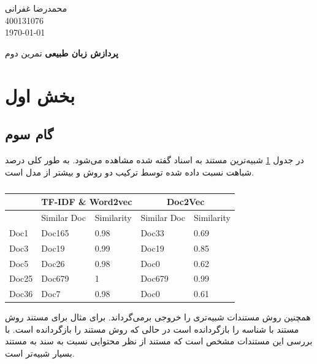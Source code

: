 \documentclass[12pt, a4paper]{article}
\newcommand{\coursetitle}{پردازش زبان طبیعی}
\newcommand{\doctitle}{تمرین دوم}
\newcommand{\name}{محمدرضا غفرانی}
\newcommand{\studentno}{400131076}
\newcommand{\todaydate}{\today}
\begin{document}
\begin{flushleft}
    \name \\
    \studentno \\
    \todaydate
\end{flushleft}

\begin{center}
    \huge
    \textbf{\coursetitle}
    \break
    \large
    \doctitle
\end{center}

\thispagestyle{plain}

\section*{بخش اول}

\subsection*{گام سوم}

در جدول \ref{similar_documents} شبیه‌ترین مستند به اسناد گفته شده مشاهده می‌شود.
به طور کلی درصد شباهت نسبت داده شده توسط ترکیب دو روش  و 
بیشتر از مدل  است.

\begin{latin}
    \begin{table}[h]
        \caption{}
        \label{similar_documents}
        \begin{tabular}[]{l|l|l||l|l}
            & \multicolumn{2}{c||}{TF-IDF \& Word2vec} & \multicolumn{2}{c}{Doc2Vec} \\ \hline
             & Similar Doc & Similarity & Similar Doc & Similarity \\ \hline
            Doc1  & Doc165 & 0.98 & Doc33  & 0.69 \\
            Doc3  & Doc19  & 0.99 & Doc19  & 0.85 \\
            Doc5  & Doc26  & 0.98 & Doc0   & 0.62 \\
            Doc25 & Doc679 & 1    & Doc679 & 0.99 \\
            Doc36 & Doc7   & 0.98 & Doc0   & 0.61
        \end{tabular}
    \end{table}
\end{latin}

همچنین روش  مستندات شبیه‌تری را
خروجی برمی‌گرداند. برای مثال برای مستند  روش  مستند با شناسه
 را بازگردانده است در حالی که روش  مستند  را بازگردانده است.
با بررسی این مستندات مشخص است که مستند  از نظر محتوایی نسبت به
سند  به مستند  بسیار شبیه‌تر است.
\end{document}
